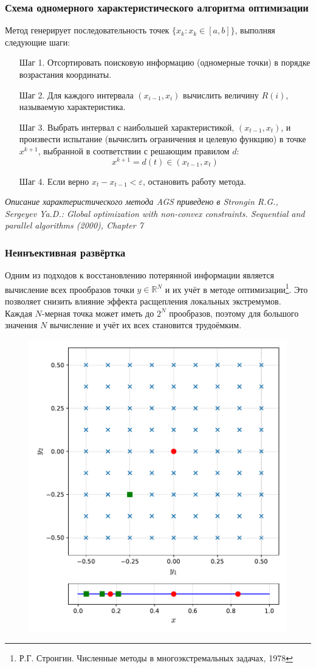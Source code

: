 \documentclass[aspectratio=1610]{beamer}
\begin{document}
\begin{frame}
  \frametitle{Схема одномерного характеристического алгоритма оптимизации}
  Метод генерирует последовательность точек \(\{x_k:x_k\in[a,b]\}\), выполняя следующие шаги:
  \begin{enumerate}
    \setlength{\itemindent}{.1in}
    \item[Шаг 1.] Отсортировать поисковую информацию (одномерные точки) в порядке возрастания координаты.
    \item[Шаг 2.] Для каждого интервала \((x_{i-1}, x_i)\) вычислить величину \(R(i)\), называемую характеристика.
    \item[Шаг 3.] Выбрать интервал с наибольшей характеристикой, \((x_{t-1}, x_{t})\), и
    произвести испытание (вычислить ограничения и целевую функцию) в точке \(x^{k+1}\), выбранной в соответствии с решающим правилом \(d\):
    \begin{displaymath}
      x^{k+1}=d(t)\in (x_{t-1}, x_{t})
    \end{displaymath}
    \item[Шаг 4.] Если верно \(x_{t}-x_{t-1}<\varepsilon\), остановить работу метода.
  \end{enumerate}
  \textit{\footnotesize	{Описание характеристического метода AGS приведено в Strongin R.G., Sergeyev Ya.D.: Global optimization with non-convex constraints. Sequential and parallel algorithms (2000), Chapter 7}}
\end{frame}

\begin{frame}
  \frametitle{Неинъективная развёртка}
    Одним из подходов к восстановлению потерянной информации является вычисление всех прообразов точки \(y\in\mathbb{R}^N\) 
    и их учёт в методе оптимизации\footnote{Р.Г. Стронгин. Численные методы в многоэкстремальных задачах, 1978}.
    Это позволяет снизить влияние эффекта расщепления локальных экстремумов.
    Каждая \(N\)-мерная точка может иметь до \(2^N\) прообразов, поэтому
    для большого значения \(N\) вычисление и учёт их всех становится трудоёмким.
      \begin{figure}[ht]
        \includegraphics[width=.25\textwidth]{evolvents/noninjective.pdf}
      \end{figure}
\end{frame}
\end{document}
